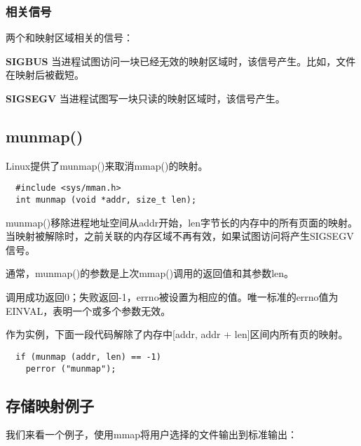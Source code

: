 \subsubsection{相关信号}

两个和映射区域相关的信号：

\begin{eqlist*}
\item[\textbf{SIGBUS}] 当进程试图访问一块已经无效的映射区域时，该信号产生。比如，文件在映射后被截短。
\item[\textbf{SIGSEGV}] 当进程试图写一块只读的映射区域时，该信号产生。
\end{eqlist*}

\subsection{munmap()}

Linux提供了munmap()来取消mmap()的映射。

\begin{lstlisting}
  #include <sys/mman.h>
  int munmap (void *addr, size_t len);
\end{lstlisting}

munmap()移除进程地址空间从addr开始，len字节长的内存中的所有页面的映射。当映射被解除时，之前关联的内存区域不再有效，如果试图访问将产生SIGSEGV信号。

通常，munmap()的参数是上次mmap()调用的返回值和其参数len。

调用成功返回0；失败返回-1，errno被设置为相应的值。唯一标准的errno值为EINVAL，表明一个或多个参数无效。

作为实例，下面一段代码解除了内存中[addr, addr + len]区间内所有页的映射。

\begin{lstlisting}
  if (munmap (addr, len) == -1)
    perror ("munmap");
\end{lstlisting}

\subsection{存储映射例子}

我们来看一个例子，使用mmap将用户选择的文件输出到标准输出：

